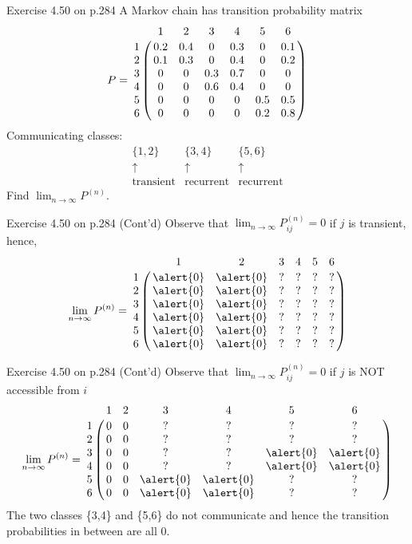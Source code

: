 \documentclass[letterpaper,handout, mathserif]{beamer}
\begin{document}
\begin{frame}{Exercise 4.50 on p.284}
A Markov chain has transition probability matrix
\[
P=
\bordermatrix{%
  &  1  &  2  &  3  &  4  &  5  &  6 \cr
1 & 0.2 & 0.4 &  0  & 0.3 &  0  & 0.1\cr
2 & 0.1 & 0.3 &  0  & 0.4 &  0  & 0.2\cr
3 &  0  &  0  & 0.3 & 0.7 &  0  &  0 \cr
4 &  0  &  0  & 0.6 & 0.4 &  0  &  0 \cr
5 &  0  &  0  &  0  &  0  & 0.5 & 0.5\cr
6 &  0  &  0  &  0  &  0  & 0.2 & 0.8
}
\]
Communicating classes:
\[
\begin{array}{ccc}
\{1,2\}&\{3,4\}&\{5,6\}\\
\uparrow &\uparrow &\uparrow \\
\text{transient}&\text{recurrent}&\text{recurrent}
\end{array}
\]
Find $\lim_{n\to\infty}P^{(n)}.$
\end{frame}
\begin{frame}{Exercise 4.50 on p.284 (Cont'd)}
Observe that
$\lim_{n\to\infty}P^{(n)}_{ij}=0$ if $j$ is transient, hence,
\[
\lim_{n\to\infty}P^{(n)}=
\bordermatrix{%
  &  1  &  2  &  3  &  4  &  5  &  6 \cr
1 & \alert{0} & \alert{0} &  ?  &  ?  &  ?  &  ? \cr
2 & \alert{0} & \alert{0} &  ?  &  ?  &  ?  &  ? \cr
3 & \alert{0} & \alert{0} &  ?  &  ?  &  ?  &  ? \cr
4 & \alert{0} & \alert{0} &  ?  &  ?  &  ?  &  ? \cr
5 & \alert{0} & \alert{0} &  ?  &  ?  &  ?  &  ? \cr
6 & \alert{0} & \alert{0} &  ?  &  ?  &  ?  &  ?
}
\]

\end{frame}
\begin{frame}{Exercise 4.50 on p.284 (Cont'd)}
Observe that
$\lim_{n\to\infty}P^{(n)}_{ij}=0$ if $j$ is NOT accessible from $i$
\[
\lim_{n\to\infty}P^{(n)}=
\bordermatrix{%
  &  1  &  2  &  3  &  4  &  5  &  6 \cr
1 & 0 & 0 &  ?  &  ?  &  ?  &  ? \cr
2 & 0 & 0 &  ?  &  ?  &  ?  &  ? \cr
3 & 0 & 0 &  ?  &  ?  & \alert{0} & \alert{0}\cr
4 & 0 & 0 &  ?  &  ?  & \alert{0} & \alert{0}\cr
5 & 0 & 0 & \alert{0} & \alert{0} &  ?  &  ? \cr
6 & 0 & 0 & \alert{0} & \alert{0} &  ?  &  ?
}
\]
The two classes \{3,4\} and \{5,6\} do not communicate
and hence the transition probabilities in between are all 0.
\end{frame}
\end{document}
